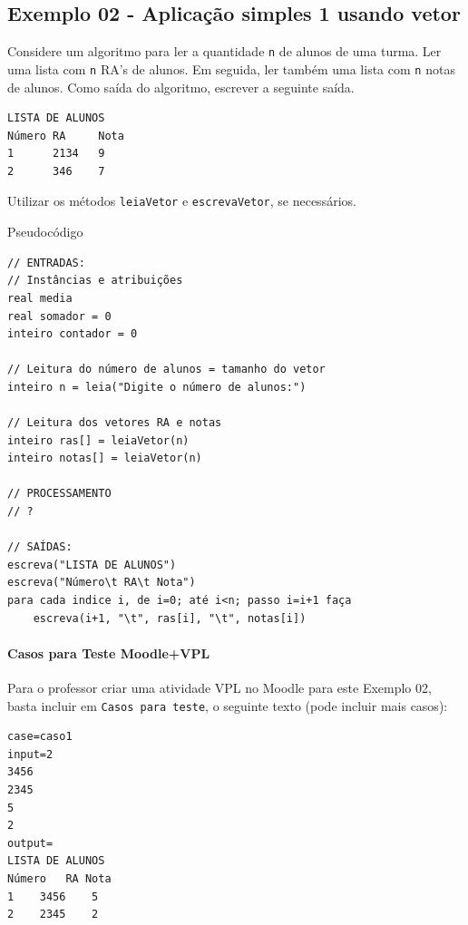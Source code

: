 \documentclass[12pt,a4paper]{article}
\begin{document}
    \hypertarget{exemplo-02---aplicauxe7uxe3o-simples-1-usando-vetor}{%
\subsection{Exemplo 02 - Aplicação simples 1 usando
vetor}\label{exemplo-02---aplicauxe7uxe3o-simples-1-usando-vetor}}

Considere um algoritmo para ler a quantidade \texttt{n} de alunos de uma
turma. Ler uma lista com \texttt{n} RA's de alunos. Em seguida, ler
também uma lista com \texttt{n} notas de alunos. Como saída do
algoritmo, escrever a seguinte saída.

\begin{verbatim}
LISTA DE ALUNOS
Número RA     Nota
1      2134   9
2      346    7
\end{verbatim}

Utilizar os métodos \texttt{leiaVetor} e \texttt{escrevaVetor}, se
necessários.

    Pseudocódigo

\begin{verbatim}
// ENTRADAS:
// Instâncias e atribuições
real media
real somador = 0
inteiro contador = 0

// Leitura do número de alunos = tamanho do vetor
inteiro n = leia("Digite o número de alunos:")

// Leitura dos vetores RA e notas
inteiro ras[] = leiaVetor(n)
inteiro notas[] = leiaVetor(n)

// PROCESSAMENTO
// ?

// SAÍDAS:
escreva("LISTA DE ALUNOS")
escreva("Número\t RA\t Nota")
para cada indice i, de i=0; até i<n; passo i=i+1 faça
    escreva(i+1, "\t", ras[i], "\t", notas[i])
\end{verbatim}

    \hypertarget{casos-para-teste-moodlevpl}{%
\paragraph{Casos para Teste
Moodle+VPL}\label{casos-para-teste-moodlevpl}}

Para o professor criar uma atividade VPL no Moodle para este Exemplo 02,
basta incluir em \texttt{Casos\ para\ teste}, o seguinte texto (pode
incluir mais casos):

\begin{verbatim}
case=caso1
input=2
3456
2345
5
2
output=
LISTA DE ALUNOS
Número   RA Nota
1    3456    5
2    2345    2
\end{verbatim}
\end{document}
